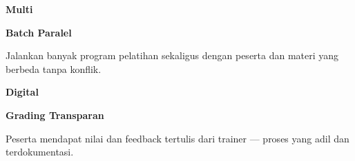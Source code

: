 \documentclass[a4paper]{article}
\begin{document}
\begin{minipage}[t]{0.485\textwidth}
    \noindent\colorbox{BlueBg}{%
        \begin{minipage}[t]{\dimexpr\linewidth-2\fboxsep}
            \vspace{6pt}
            {\fontsize{20}{24}\selectfont\bfseries\color{VioletPrimary} Multi}\par\vspace{2pt}
            {\fontsize{9.5}{12}\selectfont\bfseries\color{BlueDark} Batch Paralel}\par\vspace{2pt}
            {\fontsize{8.5}{11}\selectfont\color{TextDark}Jalankan banyak program pelatihan sekaligus dengan peserta dan materi yang berbeda tanpa konflik.}%
            \vspace{6pt}
        \end{minipage}}%
    \vspace{6pt}
    \noindent\colorbox{BlueBg}{%
        \begin{minipage}[t]{\dimexpr\linewidth-2\fboxsep}
            \vspace{6pt}
            {\fontsize{20}{24}\selectfont\bfseries\color{VioletPrimary} Digital}\par\vspace{2pt}
            {\fontsize{9.5}{12}\selectfont\bfseries\color{BlueDark} Grading Transparan}\par\vspace{2pt}
            {\fontsize{8.5}{11}\selectfont\color{TextDark}Peserta mendapat nilai dan feedback tertulis dari trainer --- proses yang adil dan terdokumentasi.}%
            \vspace{6pt}
        \end{minipage}}%
\end{minipage}

\vspace{8pt}
\end{document}
